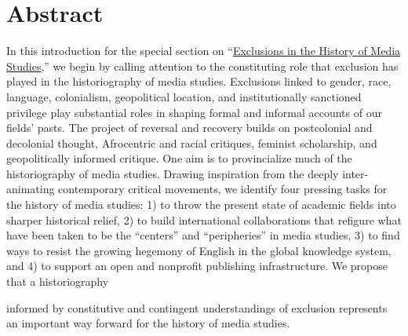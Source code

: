 \documentclass{tufte-handout}
\begin{document}
\begin{titlepage}
\begin{fullwidth}
\end{fullwidth}

\vspace*{1em}



\hypertarget{abstract}{%
\section{Abstract}\label{abstract}}

In this introduction for the special section on
``\href{https://hms.mediastudies.press/exclusions}{Exclusions in the
History of Media Studies},'' we begin by calling attention to the
constituting role that exclusion has played in the historiography of
media studies. Exclusions linked to gender, race, language, colonialism,
geopolitical location, and institutionally sanctioned privilege play
substantial roles in shaping formal and informal accounts of our fields'
pasts. The project of reversal and recovery builds on postcolonial and
decolonial thought, Afrocentric and racial critiques, feminist
scholarship, and geopolitically informed critique. One aim is to
provincialize much of the historiography of media studies. Drawing
inspiration from the deeply inter-animating contemporary critical
movements, we identify four pressing tasks for the history of media
studies: 1) to throw the present state of academic fields into sharper
historical relief, 2) to build international collaborations that
refigure what have been taken to be the ``centers'' and ``peripheries''
in media studies, 3) to find ways to resist the growing hegemony of
English in the global knowledge system, and 4) to support an open and
nonprofit publishing infrastructure. We propose that a historiography



\enlargethispage{5\baselineskip}


\vspace*{2em}





 \end{titlepage}

\noindent informed by constitutive and contingent understandings of exclusion
represents an important way forward for the history of media studies.

\vspace*{2em}
\end{document}
